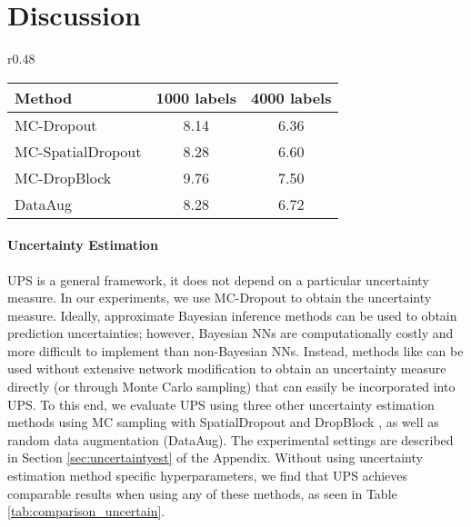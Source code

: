 \documentclass{article} \usepackage{iclr2021_conference,times}
\begin{document}
    










 



\section{Discussion}
\label{sec:discussion}
\begin{wraptable}{r}{0.48\linewidth}
\vspace{-4mm}
\caption{Comparison of methods for uncertainty estimation on CIFAR-10 (1000 labels) (Error Rate (\%))}
\centering
\label{tab:comparison_uncertain}
\small
\centering
\begin{tabular}{l|cc}
\hline
Method & 1000 labels & 4000 labels \\ \hline
MC-Dropout  &  8.14 & 6.36 \\ 
MC-SpatialDropout & 8.28  & 6.60 \\ 
MC-DropBlock & 9.76  & 7.50 \\ 
DataAug & 8.28  & 6.72 \\ 
\hline
\end{tabular}
\end{wraptable}
\paragraph{Uncertainty Estimation}
UPS is a general framework, it does not depend on a particular uncertainty  measure. In our experiments, we use MC-Dropout \citep{pmlr-v48-gal16} to obtain the uncertainty measure. Ideally, approximate Bayesian inference methods \citep{NIPS2011_4329, 10.5555/3045118.3045290, pmlr-v48-louizos16} can be used to obtain prediction uncertainties; however, Bayesian NNs are computationally costly and more difficult to implement than non-Bayesian NNs. Instead, methods like \citep{wan2013regularization, NIPS2017_7219, tompson2015efficient, NIPS2018_8271_DropBlock} can be used without extensive network modification to obtain an uncertainty measure directly (or through Monte Carlo sampling) that can easily be incorporated into UPS. To this end, we evaluate UPS using three other uncertainty estimation methods using MC sampling with SpatialDropout \citep{tompson2015efficient} and DropBlock \citep{NIPS2018_8271_DropBlock}, as well as random data augmentation (DataAug). The experimental settings are described in Section \ref{sec:uncertaintyest} of the Appendix. Without using uncertainty estimation method specific hyperparameters, we find that UPS achieves comparable results when using any of these methods, as seen in Table \ref{tab:comparison_uncertain}.
\end{document}
